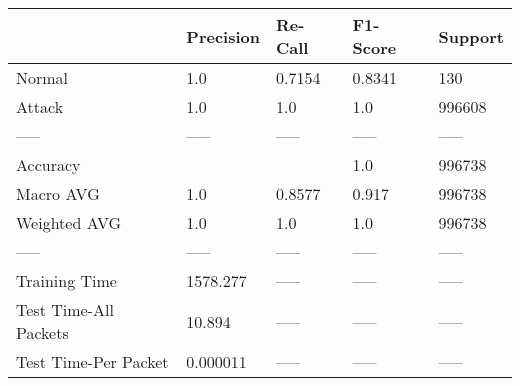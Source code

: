 \begin{tabular}{lllll}
\toprule
{} & Precision & Re-Call & F1-Score & Support \\
\midrule
Normal                &       1.0 &  0.7154 &   0.8341 &     130 \\
Attack                &       1.0 &     1.0 &      1.0 &  996608 \\
-----                 &     ----- &   ----- &    ----- &   ----- \\
Accuracy              &           &         &      1.0 &  996738 \\
Macro AVG             &       1.0 &  0.8577 &    0.917 &  996738 \\
Weighted AVG          &       1.0 &     1.0 &      1.0 &  996738 \\
-----                 &     ----- &   ----- &    ----- &   ----- \\
Training Time         &  1578.277 &   ----- &    ----- &   ----- \\
Test Time-All Packets &    10.894 &   ----- &    ----- &   ----- \\
Test Time-Per Packet  &  0.000011 &   ----- &    ----- &   ----- \\
\bottomrule
\end{tabular}
